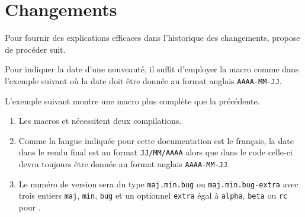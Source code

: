 

\usepackage[lang = french]{../main/main}
\usepackage{../macroenv/macroenv}
\usepackage{../inenglish/inenglish}
\usepackage{../showcase/showcase}
\usepackage{../listing/listing}
\usepackage{../rem-exa/rem-exa}

\usepackage{version-n-change}




\section{Changements}

\begin{bdocexa}
	Pour fournir des explications efficaces dans l'historique des changements,  propose de procéder suit.

\end{bdocexa}




\begin{bdocexa}
    Pour indiquer la date d'une nouveauté, il suffit d'employer la macro  comme dans l'exemple suivant où la date doit être donnée au format anglais \texttt{AAAA-MM-JJ}.

\end{bdocexa}




\begin{bdocexa}
	L'exemple suivant montre une macro plus complète que la précédente.

\end{bdocexa}


\begin{bdocrem}
    \leavevmode

    \begin{enumerate}
        \item Les macros  et  nécessitent deux compilations.

        \item Comme la langue indiquée pour cette documentation est le français, la date dans le rendu final est au format \texttt{JJ/MM/AAAA} alors que dans le code celle-ci devra toujours être donnée au format anglais \texttt{AAAA-MM-JJ}.

        \item Le numéro de version sera du type \texttt{maj.min.bug} ou \texttt{maj.min.bug-extra} avec trois entiers \texttt{maj}, \texttt{min}, \texttt{bug} et un optionnel \texttt{extra} égal à \texttt{alpha}, \texttt{beta} ou \texttt{rc} pour .
    \end{enumerate}
\end{bdocrem}



